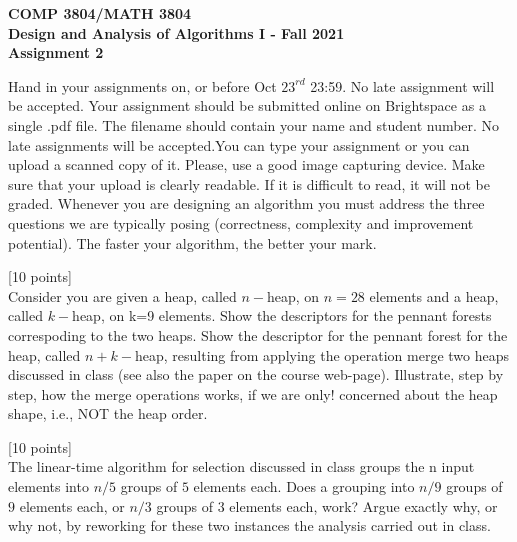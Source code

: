 \documentclass[12pt]{article}
\newcounter{ques}
\newenvironment{question}{\stepcounter{ques}{\noindent\bf Question \arabic{ques}:}}{\vspace{5mm}}
\begin{document}
 

\begin{center} \large\bf
COMP 3804/MATH 3804\\
Design and Analysis of Algorithms I  - 
Fall  2021\\
Assignment 2
\end{center} 

Hand in your assignments on, or before 
Oct $23^{rd}$ 23:59. No late assignment will be accepted. Your assignment should be submitted online on Brightspace as a single .pdf file.  The filename should contain your name and student number. No late assignments will be accepted.You can type your assignment or you can upload a scanned copy of it.  Please, use a good image capturing device. Make sure that your upload is clearly readable. If it is difficult to read, it will not be graded. Whenever you are designing an algorithm you must address the three questions we are 
typically posing (correctness, complexity and improvement potential).
The faster your 
algorithm, the better your mark.     \\

\vspace{1em} 

\begin{question}[10 points]\\
Consider you are given a heap, called $n-$heap, on $n=28$ elements and a heap, called $k-$heap, on k=9  elements. Show the 
 descriptors for the pennant forests correspoding to the two heaps. Show the descriptor for the pennant forest for the heap, called $n+k-$heap,
resulting from applying the operation merge two heaps discussed in class (see also the paper on the course web-page). Illustrate, step by step,  how the merge operations works, if we are only! concerned about
the heap shape, i.e., NOT the heap order.
    
\end{question} 

\begin{question}[10 points]\\ 
The linear-time algorithm for selection discussed in class groups the n input elements into $n/5$ groups of $5$ elements each. Does a grouping into 
$n/9$ groups of $9$ elements each, or $n/3$ groups of $3$ elements each, work? Argue exactly why, or why not, by reworking for these two instances the analysis carried 
out in class.
\end{question} 
\end{document}
